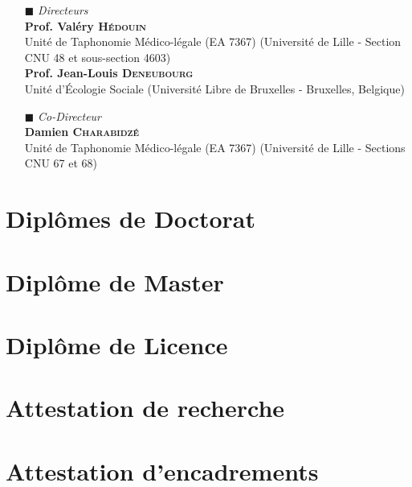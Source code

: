 \documentclass[a4paper,11pt,fleqn]{book} %
\begin{document}
\begin{itemize} 
\item[\tiny{$\blacksquare$}] \textit{Directeurs} \\
\textbf{Prof. Valéry \textsc{Hédouin}}\\ Unité de Taphonomie Médico-légale (EA 7367) (Université de Lille - Section CNU 48 et sous-section 4603)\\
\textbf{Prof. Jean-Louis \textsc{Deneubourg}}\\ Unité d'Écologie Sociale (Université Libre de Bruxelles - Bruxelles, Belgique)\\
\end{itemize}

\begin{itemize} 
\item[\tiny{$\blacksquare$}] \textit{Co-Directeur} \\
\textbf{Damien \textsc{Charabidzé}}\\ Unité de Taphonomie Médico-légale (EA 7367) (Université de Lille - Sections CNU 67 et 68)
\end{itemize}



\chapter{Diplômes de Doctorat}



\chapter{Diplôme de Master}


\chapter{Diplôme de Licence}


\chapter{Attestation de recherche}


\chapter{Attestation d'encadrements}

\end{document}
